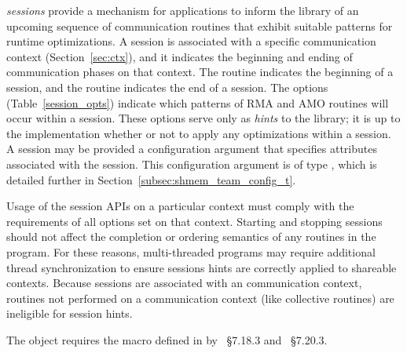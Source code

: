 \openshmem \emph{sessions} provide a mechanism for applications to inform the
\openshmem library of an upcoming sequence of communication routines that
exhibit suitable patterns for runtime optimizations.
A session is associated with a specific \openshmem communication context
(Section~\ref{sec:ctx}), and it indicates the beginning and ending of
communication phases on that context.
The  routine indicates the beginning of a session,
and the  routine indicates the end of a session.
The  options (Table~\ref{session_opts}) indicate
which patterns of \openshmem RMA and AMO routines will occur within a session.
These options serve only as \textit{hints} to the library; it is up to the
implementation whether or not to apply any optimizations within a session.
A session may be provided a configuration argument that specifies attributes
associated with the session. This configuration argument is of type
, which is detailed further in
Section~\ref{subsec:shmem_team_config_t}.

Usage of the \openshmem session APIs on a particular context must comply with
the requirements of all options set on that context.
Starting and stopping \openshmem sessions should not affect the completion or
ordering semantics of any \openshmem routines in the program.
For these reasons, multi-threaded \openshmem programs may require additional
thread synchronization to ensure sessions hints are correctly applied to
shareable contexts.
Because sessions are associated with an \openshmem communication context,
routines not performed on a communication context (like collective routines)
are ineligible for session hints.

The  object requires the 
macro defined in  by \Cstd[99]~\S7.18.3 and
\Cstd[11]~\S7.20.3.
